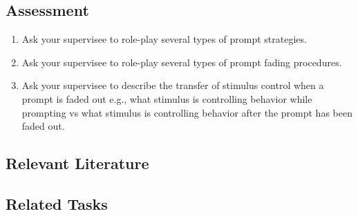 \subsection{Assessment}
\begin{enumerate}
\item Ask your supervisee to role-play several types of prompt strategies.
\item Ask your supervisee to role-play several types of prompt fading procedures.
\item Ask your supervisee to describe the transfer of stimulus control when a prompt is faded out e.g., what stimulus is controlling behavior while prompting vs what stimulus is controlling behavior after the prompt has been faded out.
\end{enumerate}
%
\subsection{Relevant Literature}
\begin{refsection}
\nocite{test,alang2017police,clayton2018black}
\printbibliography[heading=none]
\end{refsection}
%
\subsection{Related Tasks}
\fourdFour{}\\
\fourdFive{}\\
\fourdSix{}\\
\fourdSeven{}\\
\fourdEight{}\\
\foureOne{}\\
\foureTwo{}\\
\foureThirteen{}\\
\fourFKTwentyFour{}\\
%
%
%
%
%
%
\section{\fourdFour{}}
